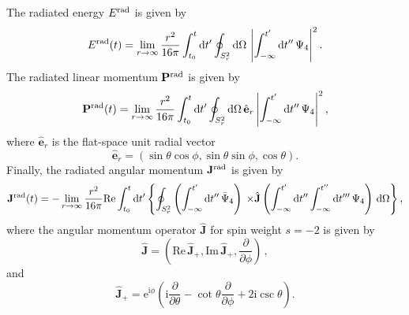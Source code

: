 The radiated energy $E^{\mathrm{rad}}$ is given by
\cite{Campanelli:1998jv,Lousto:2007mh}
\begin{equation}
    E^{\mathrm{rad}}(t) = \lim_{r\to\infty}\frac{r^2}{16\pi}\int_{t_0}^t\mathrm{d} t^\prime
    \oint_{S^2_r}\mathrm{d}\Omega\,\left|\int_{-\infty}^{t^\prime}\mathrm{d} t^{\prime\prime}\,
    \Psi_4\right|^2.\label{bhkick:eq:Erad}
\end{equation}
The radiated linear momentum $\mathbf{P}^{\mathrm{rad}}$ is given by
\begin{equation}
    \mathbf{P}^{\mathrm{rad}}(t) = \lim_{r\to\infty}\frac{r^2}{16\pi}
    \int_{t_0}^t\mathrm{d} t^\prime\oint_{S^2_r}\mathrm{d}\Omega\,
    \hat{\mathbf{e}}_r\left|\int_{-\infty}^{t^\prime}\mathrm{d} t^{\prime\prime}\,
    \Psi_4\right|^2,\label{bhkick:eq:Prad}
\end{equation}
where $\hat{\mathbf{e}}_r$ is the flat-space unit radial vector
\begin{equation}
    \hat{\mathbf{e}}_r = (\sin\theta\cos\phi,\sin\theta\sin\phi,\cos\theta).
\end{equation}
Finally, the radiated angular momentum $\mathbf{J}^{\mathrm{rad}}$ is given by
\begin{equation}
    \mathbf{J}^{\mathrm{rad}}(t) = - 
    \lim_{r\to\infty}\frac{r^2}{16\pi}\mathrm{Re}\int_{t_0}^{t}\mathrm{d} t^\prime
    \left\{\oint_{S^2_r}\left(\int_{-\infty}^{t^\prime}\mathrm{d} t^{\prime\prime}\,
    \bar{\Psi}_4\right)\right.
    \left. \times\hat{\mathbf{J}}\left(\int_{-\infty}^{t^\prime}
    \mathrm{d} t^{\prime\prime}\int_{-\infty}^{t^{\prime\prime}}
    \mathrm{d} t^{\prime\prime\prime}\,\Psi_4\right)\,\mathrm{d}\Omega\right\},
    \label{bhkick:eq:Jrad}
\end{equation}
where the angular momentum operator $\hat{\mathbf{J}}$ for spin weight 
$s=-2$ is given by
\begin{equation}
    \hat{\mathbf{J}}=\left(\mathrm{Re}\,\hat{\mathbf{J}}_+,\mathrm{Im}\,
    \hat{\mathbf{J}}_+,\frac{\partial}{\partial\phi}\right)\,,
\end{equation}
and
\begin{equation}
    \hat{\mathbf{J}}_+=\mathrm{e}^{\mathrm{i}\phi}\left(\mathrm{i}
    \frac{\partial}{\partial\theta} - \cot\theta\frac{\partial}{\partial\phi} 
    + 2\mathrm{i}\csc\theta\right).
\end{equation}

